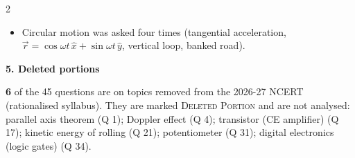 \begin{multicols}{2}
{\begin{itemize}[leftmargin=1em,nosep]
\item Circular motion was asked four times (tangential acceleration, $\vec r=\cos\omega t\,\hat x+\sin\omega t\,\hat y$, vertical loop, banked road).
\end{itemize}}\par\medskip
\textbf{\color{crimson}5. Deleted portions}\par\smallskip
\textbf{6} of the 45 questions are on topics removed from the 2026-27 NCERT (rationalised syllabus). They are marked \textsc{Deleted Portion} and are not analysed: parallel axis theorem (Q 1); Doppler effect (Q 4); transistor (CE amplifier) (Q 17); kinetic energy of rolling (Q 21); potentiometer (Q 31); digital electronics (logic gates) (Q 34).\par
\end{multicols}


